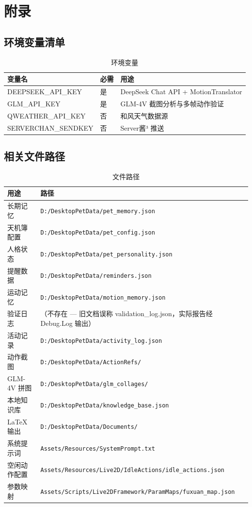 \documentclass[12pt,a4paper]{ctexart}
\begin{document}
\section{附录}

\subsection{环境变量清单}

\begin{table}[H]
\centering
\caption{环境变量}
\label{tab:env}
\begin{tabular}{lll}
\toprule
\textbf{变量名} & \textbf{必需} & \textbf{用途} \\
\midrule
DEEPSEEK\_API\_KEY & 是 & DeepSeek Chat API + MotionTranslator \\
GLM\_API\_KEY & 是 & GLM-4V 截图分析与多帧动作验证 \\
QWEATHER\_API\_KEY & 否 & 和风天气数据源 \\
SERVERCHAN\_SENDKEY & 否 & Server酱³ 推送 \\
\bottomrule
\end{tabular}
\end{table}

\subsection{相关文件路径}

\begin{table}[H]
\centering
\caption{文件路径}
\label{tab:paths}
\begin{tabular}{ll}
\toprule
\textbf{用途} & \textbf{路径} \\
\midrule
长期记忆 & \texttt{D:/DesktopPetData/pet\_memory.json} \\
天机簿配置 & \texttt{D:/DesktopPetData/pet\_config.json} \\
人格状态 & \texttt{D:/DesktopPetData/pet\_personality.json} \\
提醒数据 & \texttt{D:/DesktopPetData/reminders.json} \\
运动记忆 & \texttt{D:/DesktopPetData/motion\_memory.json} \\
验证日志 & （不存在 --- 旧文档误称 validation\_log.json，实际报告经 Debug.Log 输出） \\
活动记录 & \texttt{D:/DesktopPetData/activity\_log.json} \\
动作截图 & \texttt{D:/DesktopPetData/ActionRefs/} \\
GLM-4V 拼图 & \texttt{D:/DesktopPetData/glm\_collages/} \\
本地知识库 & \texttt{D:/DesktopPetData/knowledge\_base.json} \\
LaTeX 输出 & \texttt{D:/DesktopPetData/Documents/} \\
系统提示词 & \texttt{Assets/Resources/SystemPrompt.txt} \\
空闲动作配置 & \texttt{Assets/Resources/Live2D/IdleActions/idle\_actions.json} \\
参数映射 & \texttt{Assets/Scripts/Live2DFramework/ParamMaps/fuxuan\_map.json} \\
\bottomrule
\end{tabular}
\end{table}
\end{document}
